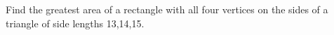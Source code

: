 Find the greatest area of a rectangle with all four vertices on the sides of a triangle of side lengths 13,14,15.
